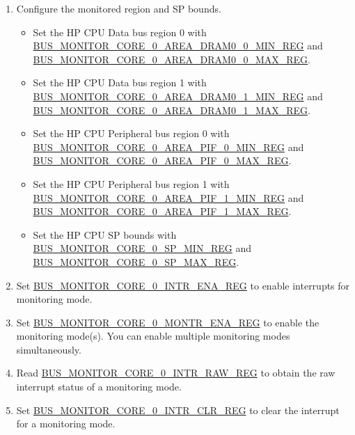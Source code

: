 \documentclass[main\_\_EN.tex]{subfiles}
\begin{document}
\begin{enumerate}
    \item Configure the monitored region and SP bounds.
        \begin{itemize}
            \item Set the HP CPU Data bus region 0 with \hyperref[regdesc:BUSMONITORCORE0AREADRAM00MINREG]{BUS\_MONITOR\_CORE\_0\_AREA\_DRAM0\_0\_MIN\_REG} and \hyperref[regdesc:BUSMONITORCORE0AREADRAM00MAXREG]{BUS\_MONITOR\_CORE\_0\_AREA\_DRAM0\_0\_MAX\_REG}. 
            \item Set the HP CPU Data bus region 1 with \hyperref[regdesc:BUSMONITORCORE0AREADRAM01MINREG]{BUS\_MONITOR\_CORE\_0\_AREA\_DRAM0\_1\_MIN\_REG} and \hyperref[regdesc:BUSMONITORCORE0AREADRAM01MAXREG]{BUS\_MONITOR\_CORE\_0\_AREA\_DRAM0\_1\_MAX\_REG}.
            \item Set the HP CPU Peripheral bus region 0 with \hyperref[regdesc:BUSMONITORCORE0AREAPIF0MINREG]{BUS\_MONITOR\_CORE\_0\_AREA\_PIF\_0\_MIN\_REG} and \hyperref[regdesc:BUSMONITORCORE0AREAPIF0MAXREG]{BUS\_MONITOR\_CORE\_0\_AREA\_PIF\_0\_MAX\_REG}.
            \item Set the HP CPU Peripheral bus region 1 with \hyperref[regdesc:BUSMONITORCORE0AREAPIF1MINREG]{BUS\_MONITOR\_CORE\_0\_AREA\_PIF\_1\_MIN\_REG} and \hyperref[regdesc:BUSMONITORCORE0AREAPIF1MAXREG]{BUS\_MONITOR\_CORE\_0\_AREA\_PIF\_1\_MAX\_REG}.
            \item Set the HP CPU SP bounds with \hyperref[regdesc:BUSMONITORCORE0SPMINREG]{BUS\_MONITOR\_CORE\_0\_SP\_MIN\_REG} and \hyperref[regdesc:BUSMONITORCORE0SPMAXREG]{BUS\_MONITOR\_CORE\_0\_SP\_MAX\_REG}.
        \end{itemize}
    \item Set \hyperref[regdesc:BUSMONITORCORE0INTRENAREG]{BUS\_MONITOR\_CORE\_0\_INTR\_ENA\_REG} to enable interrupts for monitoring mode.
    \item Set \hyperref[regdesc:BUSMONITORCORE0MONTRENAREG]{BUS\_MONITOR\_CORE\_0\_MONTR\_ENA\_REG} to enable the monitoring mode(s). You can enable multiple monitoring modes simultaneously.
    \item Read \hyperref[regdesc:BUSMONITORCORE0INTRRAWREG]{BUS\_MONITOR\_CORE\_0\_INTR\_RAW\_REG} to obtain the raw interrupt status of a monitoring mode. 
    \item Set \hyperref[regdesc:BUSMONITORCORE0INTRCLRREG]{BUS\_MONITOR\_CORE\_0\_INTR\_CLR\_REG} to clear the interrupt for a monitoring mode.
\end{enumerate}
\end{document}

